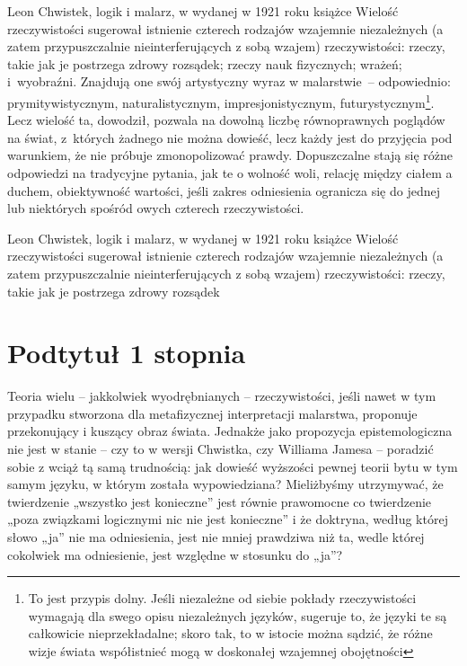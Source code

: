 \noindent Leon Chwistek, logik i malarz, w wydanej w 1921 roku książce Wielość rzeczywistości sugerował istnienie czterech rodzajów wzajemnie niezależnych (a zatem przypuszczalnie nieinterferujących z sobą wzajem) rzeczywistości: rzeczy, takie jak je postrzega zdrowy rozsądek; rzeczy nauk fizycznych; wrażeń; i wyobraźni. Znajdują one swój artystyczny wyraz w malarstwie – odpowiednio: prymitywistycznym, naturalistycznym, impresjonistycznym, futurystycznym\footnote{To jest przypis dolny. Jeśli niezależne od siebie pokłady rzeczywistości wymagają dla swego opisu niezależnych języków, sugeruje to, że języki te są całkowicie nieprzekładalne; skoro tak, to w istocie można sądzić, że różne wizje świata współistnieć mogą w doskonałej wzajemnej obojętności}. Lecz wielość ta, dowodził, pozwala na dowolną liczbę równoprawnych poglądów na świat, z których żadnego nie można dowieść, lecz każdy jest do przyjęcia pod warunkiem, że nie próbuje zmonopolizować prawdy. Dopuszczalne stają się różne odpowiedzi na tradycyjne pytania, jak te o wolność woli, relację między ciałem a duchem, obiektywność wartości, jeśli zakres odniesienia ogranicza się do jednej lub niektórych spośród owych czterech rzeczywistości.

\noindent Leon Chwistek, logik i malarz, w wydanej w 1921 roku książce Wielość rzeczywistości sugerował istnienie czterech rodzajów wzajemnie niezależnych (a zatem przypuszczalnie
nieinterferujących z sobą wzajem) rzeczywistości: rzeczy, takie jak je postrzega zdrowy rozsądek

\section{Podtytuł 1 stopnia}

\noindent Teoria wielu -- jakkolwiek wyodrębnianych -- rzeczywistości, jeśli nawet w tym przypadku stworzona dla metafizycznej interpretacji malarstwa, proponuje przekonujący i kuszący obraz świata. Jednakże jako propozycja epistemologiczna nie jest w stanie -- czy to w wersji Chwistka, czy Williama Jamesa -- poradzić sobie z wciąż tą samą trudnością: jak dowieść wyższości pewnej teorii bytu w tym samym języku, w którym została wypowiedziana? Mieliżbyśmy utrzymywać, że twierdzenie „wszystko jest konieczne” jest równie prawomocne co twierdzenie „poza związkami logicznymi nic nie jest konieczne” i że doktryna, według której słowo „ja” nie ma odniesienia, jest nie mniej prawdziwa niż ta, wedle której cokolwiek ma odniesienie, jest względne w stosunku do „ja”?

